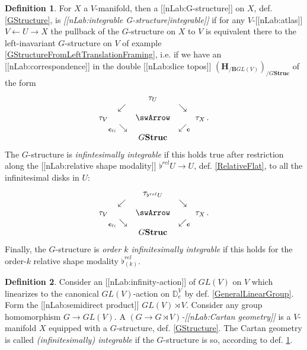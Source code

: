 \documentclass[12pt,titlepage]{article}
\def\mathllap{\mathpalette\mathllapinternal}
\def\mathrlap{\mathpalette\mathrlapinternal}
\def\mathllapinternal#1#2{\llap{$\mathsurround=0pt#1{#2}$}}
\def\mathrlapinternal#1#2{\rlap{$\mathsurround=0pt#1{#2}$}}
\newcommand{\itexarray}[1]{\begin{matrix}#1\end{matrix}}
\theoremstyle{plain}
\theoremstyle{definition}
\newtheorem{defn}{Definition}
\theoremstyle{remark}
\begin{document}
\begin{defn}
\label{IntegrabilityOfGStructure}\hypertarget{IntegrabilityOfGStructure}{}
For $X$ a $V$-manifold, then a [[nLab:G-structure]] on $X$, def. \ref{GStructure}, is \emph{[[nLab:integrable G-structure|integrable]]} if for any $V$-[[nLab:atlas]] $V \leftarrow U \rightarrow X$ the pullback of the $G$-structure on $X$ to $V$ is equivalent there to the left-inavariant $G$-structure on $V$ of example \ref{GStructureFromLeftTranslationFraming}, i.e. if we have an [[nLab:correspondence]] in the double [[nLab:slice topos]] $(\mathbf{H}_{/\mathbf{B}GL(V)})_{/G\mathbf{Struc}}$ of the form
\begin{displaymath}
\itexarray{
     && \tau_U
     \\
     & \swarrow && \searrow
     \\
     \tau_V && \swArrow && \tau_X
     \\
     & {}_{\mathllap{\mathbf{c}_{li}}}\searrow && \swarrow_{\mathrlap{\mathbf{c}}}
     \\
     && G \mathbf{Struc}
  }
  \,.
\end{displaymath}
The $G$-structure is \emph{infintesimally integrable} if this holds true after restriction along the [[nLab:relative shape modality]] $\flat^{rel} U \to U$, def. \ref{RelativeFlat}, to all the infinitesimal disks in $U$:
\begin{displaymath}
\itexarray{
     && \tau_{\flat^{rel}U}
     \\
     & \swarrow && \searrow
     \\
     \tau_V && \swArrow && \tau_X
     \\
     & {}_{\mathllap{\mathbf{c}_{li}}}\searrow && \swarrow_{\mathrlap{\mathbf{c}}}
     \\
     && G \mathbf{Struc}
  }
  \,.
\end{displaymath}
Finally, the $G$-structure is \emph{order $k$ infinitesimally integrable} if this holds for the order-$k$ relative shape modality $\flat^{rel}_{(k)}$.
\end{defn}
\begin{defn}
\label{CartanGeometry}\hypertarget{CartanGeometry}{}
Consider an [[nLab:infinity-action]] of $GL(V)$ on $V$ which linearizes to the canonical $GL(V)$-action on $\mathbb{D}^V_e$ by def. \ref{GeneralLinearGroup}. Form the [[nLab:semidirect product]] $GL(V) \rtimes V$. Consider any group homomorphism $G\to GL(V)$.
A \emph{$(G\to G\rtimes V)$-[[nLab:Cartan geometry]]} is a $V$-manifold $X$ equipped with a $G$-structure, def. \ref{GStructure}. The Cartan geometry is called \emph{(infinitesimally) integrable} if the $G$-structure is so, according to def. \ref{IntegrabilityOfGStructure}.
\end{defn}
\end{document}

